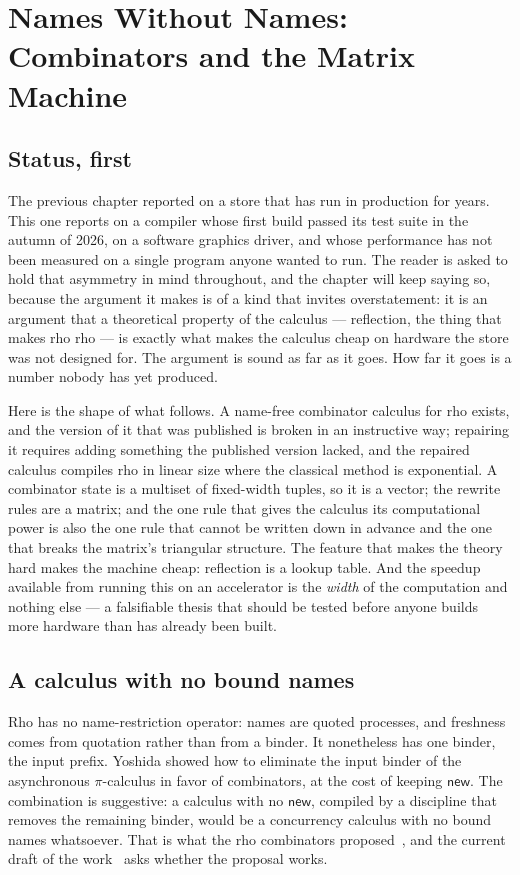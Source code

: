 \chapter{Names Without Names: Combinators and the Matrix Machine}
\label{ch:combinators}

\section{Status, first}

The previous chapter reported on a store that has run in production for years. This one
reports on a compiler whose first build passed its test suite in the autumn of 2026, on a
software graphics driver, and whose performance has not been measured on a single program
anyone wanted to run. The reader is asked to hold that asymmetry in mind throughout, and
the chapter will keep saying so, because the argument it makes is of a kind that invites
overstatement: it is an argument that a theoretical property of the calculus ---
reflection, the thing that makes rho rho --- is exactly what makes the calculus cheap on
hardware the store was not designed for. The argument is sound as far as it goes. How far
it goes is a number nobody has yet produced.

Here is the shape of what follows. A name-free combinator calculus for rho exists, and the
version of it that was published is broken in an instructive way; repairing it requires
adding something the published version lacked, and the repaired calculus compiles rho in
linear size where the classical method is exponential. A combinator state is a multiset of
fixed-width tuples, so it is a vector; the rewrite rules are a matrix; and the one rule
that gives the calculus its computational power is also the one rule that cannot be
written down in advance and the one that breaks the matrix's triangular structure. The
feature that makes the theory hard makes the machine cheap: reflection is a lookup table.
And the speedup available from running this on an accelerator is the \emph{width} of the
computation and nothing else --- a falsifiable thesis that should be tested before anyone
builds more hardware than has already been built.

\section{A calculus with no bound names}
\label{cb:sec:calculus}

Rho has no name-restriction operator: names are quoted processes, and freshness comes
from quotation rather than from a binder. It nonetheless has one binder, the input
prefix. Yoshida showed how to eliminate the input binder of the asynchronous
$\pi$-calculus in favor of combinators, at the cost of keeping $\mathsf{new}$. The
combination is suggestive: a calculus with no $\mathsf{new}$, compiled by a discipline
that removes the remaining binder, would be a concurrency calculus with no bound names
whatsoever. That is what the rho combinators proposed~\cite{rhocomb}, and the current
draft of the work~\cite{rhocomb3} asks whether the proposal works.

